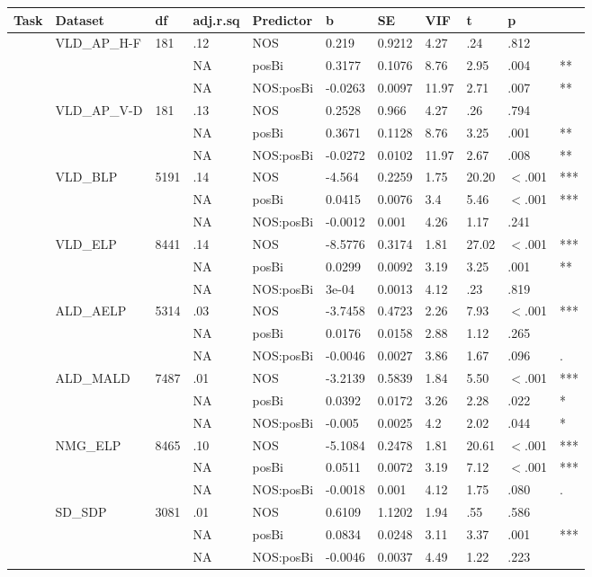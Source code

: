 \begin{table}[ht]
\centering
\begingroup\normalsize
\begin{tabular}{lllllllllll}
  \hline
Task & Dataset & df & adj.r.sq & Predictor & b & SE & VIF & t & p &  \\ 
  \hline
 & VLD\_AP\_H-F & 181 & .12 & NOS & 0.219 & 0.9212 & 4.27 & .24 & .812 &   \\ 
   &  &  & NA & posBi & 0.3177 & 0.1076 & 8.76 & 2.95 & .004 & ** \\ 
   &  &  & NA & NOS:posBi & -0.0263 & 0.0097 & 11.97 & 2.71 & .007 & ** \\ 
   & VLD\_AP\_V-D & 181 & .13 & NOS & 0.2528 & 0.966 & 4.27 & .26 & .794 &   \\ 
   &  &  & NA & posBi & 0.3671 & 0.1128 & 8.76 & 3.25 & .001 & ** \\ 
   &  &  & NA & NOS:posBi & -0.0272 & 0.0102 & 11.97 & 2.67 & .008 & ** \\ 
   & VLD\_BLP & 5191 & .14 & NOS & -4.564 & 0.2259 & 1.75 & 20.20 & $<$.001 & *** \\ 
   &  &  & NA & posBi & 0.0415 & 0.0076 & 3.4 & 5.46 & $<$.001 & *** \\ 
   &  &  & NA & NOS:posBi & -0.0012 & 0.001 & 4.26 & 1.17 & .241 &   \\ 
   & VLD\_ELP & 8441 & .14 & NOS & -8.5776 & 0.3174 & 1.81 & 27.02 & $<$.001 & *** \\ 
   &  &  & NA & posBi & 0.0299 & 0.0092 & 3.19 & 3.25 & .001 & ** \\ 
   &  &  & NA & NOS:posBi & 3e-04 & 0.0013 & 4.12 & .23 & .819 &   \\ 
   & ALD\_AELP & 5314 & .03 & NOS & -3.7458 & 0.4723 & 2.26 & 7.93 & $<$.001 & *** \\ 
   &  &  & NA & posBi & 0.0176 & 0.0158 & 2.88 & 1.12 & .265 &   \\ 
   &  &  & NA & NOS:posBi & -0.0046 & 0.0027 & 3.86 & 1.67 & .096 & . \\ 
   & ALD\_MALD & 7487 & .01 & NOS & -3.2139 & 0.5839 & 1.84 & 5.50 & $<$.001 & *** \\ 
   &  &  & NA & posBi & 0.0392 & 0.0172 & 3.26 & 2.28 & .022 & * \\ 
   &  &  & NA & NOS:posBi & -0.005 & 0.0025 & 4.2 & 2.02 & .044 & * \\ 
   & NMG\_ELP & 8465 & .10 & NOS & -5.1084 & 0.2478 & 1.81 & 20.61 & $<$.001 & *** \\ 
   &  &  & NA & posBi & 0.0511 & 0.0072 & 3.19 & 7.12 & $<$.001 & *** \\ 
   &  &  & NA & NOS:posBi & -0.0018 & 0.001 & 4.12 & 1.75 & .080 & . \\ 
   & SD\_SDP & 3081 & .01 & NOS & 0.6109 & 1.1202 & 1.94 & .55 & .586 &   \\ 
   &  &  & NA & posBi & 0.0834 & 0.0248 & 3.11 & 3.37 & .001 & *** \\ 
   &  &  & NA & NOS:posBi & -0.0046 & 0.0037 & 4.49 & 1.22 & .223 &   \\ 
   \hline
\end{tabular}
\endgroup
\end{table}
